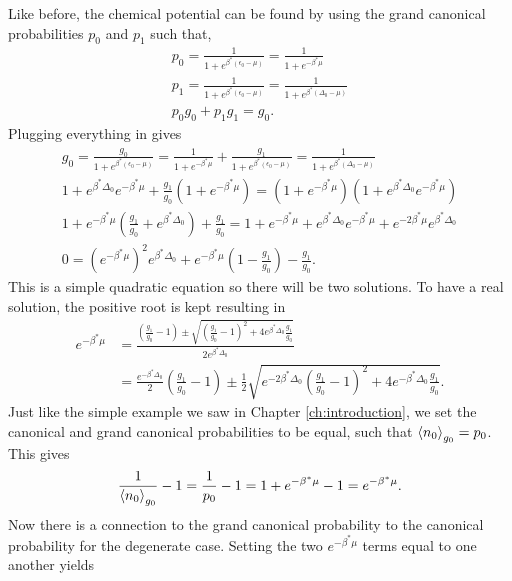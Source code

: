 Like before, the chemical potential can be found by using the grand canonical probabilities $p_0$ and $p_1$ such that,
\begin{gather}
    p_0=\frac{1}{1+e^{\beta^*(\epsilon_0-\mu)}}=\frac{1}{1+e^{-\beta^* \mu}} \label{grcn}\\
    p_1=\frac{1}{1+e^{\beta^*(\epsilon_0-\mu)}}=\frac{1}{1+e^{\beta^*(\Delta_0-\mu)}}\\
    p_0g_0+p_1g_1=g_0. \label{2.24}
\end{gather}
Plugging everything in gives
\begin{gather}
    g_0=\frac{g_0}{1+e^{\beta^*(\epsilon_0-\mu)}}=\frac{1}{1+e^{-\beta^*\mu}}+\frac{g_1}{1+e^{\beta^*(\epsilon_0-\mu)}}=\frac{1}{1+e^{\beta^*(\Delta_0-\mu)}}\nonumber\\
    1+e^{\beta^*\Delta_0} e^{-\beta^*\mu}+\frac{g_1}{g_0}(1+e^{-\beta^*\mu})=(1+e^{-\beta^*\mu})(1+e^{\beta^*\Delta_0} e^{-\beta^* \mu})\nonumber\\
    1+e^{-\beta^*\mu}(\frac{g_1}{g_0}+e^{\beta^*\Delta_0})+\frac{g_1}{g_0}=1+e^{-\beta^*\mu}+e^{\beta^*\Delta_0}e^{-\beta^*\mu}+e^{-2\beta^*\mu}e^{\beta^*\Delta_0}\nonumber\\
    0=(e^{-\beta^*\mu})^2 e^{\beta^*\Delta_0} +e ^{-\beta^*\mu}(1-\frac{g_1}{g_0})-\frac{g_1}{g_0}.
\end{gather}
This is a simple quadratic equation so there will be two solutions. To have a real solution, the positive root is kept resulting in
\begin{align}
    e^{-\beta^*\mu}&=\frac{(\frac{g_1}{g_0}-1)\pm\sqrt{(\frac{g_1}{g_0}-1)^2+4e^{\beta^*\Delta_0}\frac{g_1}{g_0}}}{2e^{\beta^*\Delta_0}}\nonumber\\
    &=\frac{e^{-\beta^*\Delta_0}}{2}(\frac{g_1}{g_0}-1)\pm \frac{1}{2}\sqrt{e^{-2\beta^*\Delta_0} (\frac{g_1}{g_0}-1)^2+ 4e^{-\beta^*\Delta_0}\frac{g_1}{g_0}}.
\end{align}
Just like the simple example we saw in Chapter \ref{ch:introduction}, we set the canonical and grand canonical probabilities to be equal, such that $\left<{n_0}\right>_{g_0}=p_0$. This gives 
\begin{align}
    \frac{1}{\left<{n_0}\right>_{g_0}}-1=\frac{1}{p_0}-1=1+e^{-\beta^*\mu}-1=e^{-\beta^*\mu} . \label{2.27}
\end{align}
Now there is a connection to the grand canonical probability to the canonical probability for the degenerate case. Setting the two $e^{-\beta^*\mu}$ terms equal to one another yields
